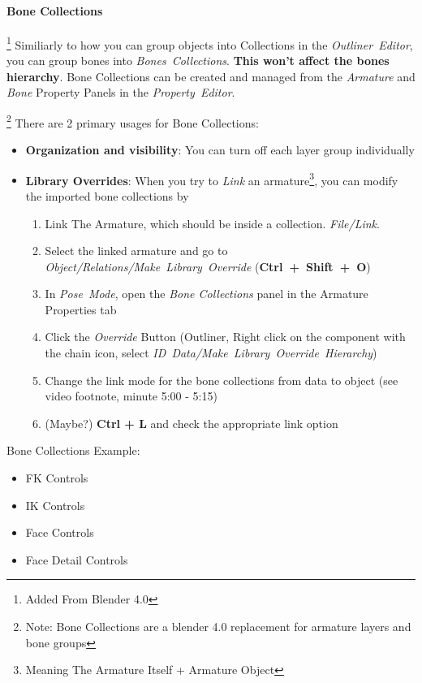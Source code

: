\documentclass{article}
\begin{document}
\paragraph{Bone Collections}\footnote{Added From Blender 4.0}
Similiarly to how you can group objects into Collections in the \mbox{\textit{Outliner Editor}}, you can group bones into \mbox{\textit{Bones Collections}}. \textbf{This won't affect the bones hierarchy}.
Bone Collections can be created and managed from the \textit{Armature} and \textit{Bone} Property Panels in the \mbox{\textit{Property Editor}}.\par\footnote{Note: Bone Collections are a blender 4.0 
replacement for armature layers and bone groups}
There are 2 primary usages for Bone Collections:
\begin{itemize}[noitemsep, topsep=0pt]
    \item \textbf{Organization and visibility}: You can turn off each layer group individually
    \item \textbf{Library Overrides}\footnotemark: When you try to \textit{Link} an armature\footnote{Meaning The Armature Itself + Armature Object}, you can modify the imported bone collections by
    \begin{enumerate}[noitemsep, topsep=0pt]
        \item Link The Armature, which should be inside a collection. \mbox{\textit{File/Link}}.
        \item Select the linked armature and go to \mbox{\textit{Object/Relations/Make Library Override}} (\mbox{\textbf{Ctrl + Shift + O}})
        \item In \mbox{\textit{Pose Mode}}, open the \textit{Bone Collections} panel in the Armature Properties tab
        \item Click the \textit{Override} Button (Outliner, Right click on the component with the chain icon, select \mbox{\textit{ID Data/Make Library Override Hierarchy}})
        \item Change the link mode for the bone collections from data to object (see video footnote, minute 5:00 - 5:15)
        \item (Maybe?) \textbf{Ctrl + L} and check the appropriate link option
    \end{enumerate}
\end{itemize}
Bone Collections Example:
\begin{itemize}[noitemsep, topsep=0pt]
    \item FK Controls
    \item IK Controls
    \item Face Controls
    \item Face Detail Controls
\end{itemize}
\end{document}
